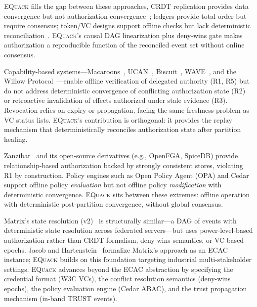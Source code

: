 \documentclass[10pt,journal,compsoc]{IEEEtran}
\newcommand{\equack}{\textsc{EQuack}}
\begin{document}
\equack{} fills the gap between these approaches, CRDT replication provides data convergence but not authorization convergence~\cite{shapiro2011crdt,gomes2017_sec}; ledgers provide total order but require consensus; token/VC designs support offline checks but lack deterministic reconciliation~\cite{rouhani2021distributed}. \equack{}'s causal DAG linearization plus deny-wins gate makes authorization a reproducible function of the reconciled event set without online consensus.

Capability-based systems---Macaroons~\cite{birgisson2014macaroons}, UCAN~\cite{ucan2022}, Biscuit~\cite{biscuit2023}, WAVE~\cite{andersen2019wave}, and the Willow Protocol~\cite{willow2024}---enable offline verification of delegated authority (R1, R5) but do not address deterministic convergence of conflicting authorization state (R2) or retroactive invalidation of effects authorized under stale evidence (R3). Revocation relies on expiry or propagation, facing the same freshness problem as VC status lists. \equack{}'s contribution is orthogonal: it provides the replay mechanism that deterministically reconciles authorization state after partition healing.

Zanzibar~\cite{zanzibar2019} and its open-source derivatives (e.g., OpenFGA, SpiceDB) provide relationship-based authorization backed by strongly consistent stores, violating R1 by construction. Policy engines such as Open Policy Agent (OPA) and Cedar~\cite{cutler2024cedar} support offline policy \emph{evaluation} but not offline policy \emph{modification} with deterministic convergence. \equack{} sits between these extremes: offline operation with deterministic post-partition convergence, without global consensus.

Matrix's state resolution (v2)~\cite{matrix_stateresv2} is structurally similar---a DAG of events with deterministic state resolution across federated servers---but uses power-level-based authorization rather than CRDT formalism, deny-wins semantics, or VC-based epochs. Jacob and Hartenstein~\cite{jacob2024eventuallyac} formalize Matrix's approach as an ECAC instance; \equack{} builds on this foundation targeting industrial multi-stakeholder settings. \equack{} advances beyond the ECAC abstraction by specifying the credential format (W3C VCs), the conflict resolution semantics (deny-wins epochs), the policy evaluation engine (Cedar ABAC), and the trust propagation mechanism (in-band TRUST events).
\end{document}
